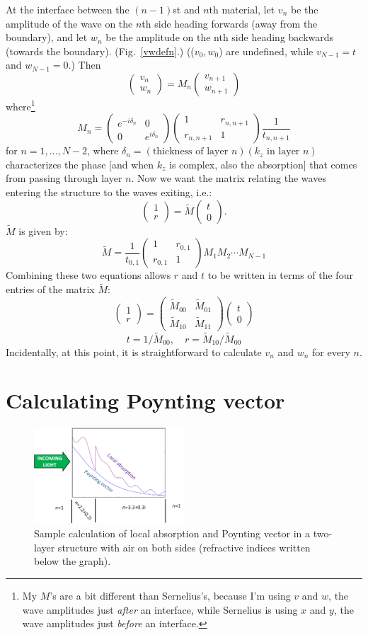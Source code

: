 \documentclass[12pt]{article}
\newcommand{\smat}{\left( \begin{matrix}} %
\newcommand{\emat}{\end{matrix} \right)} %
\renewcommand{\(}{\left(}
\renewcommand{\)}{\right)}
\renewcommand{\r}{\mathbf{r}}
\begin{document}
At the interface between the $(n-1)$st and $n$th material, let $v_n$ be the amplitude of the wave on the $n$th side heading forwards (away from the boundary), and let $w_n$ be the amplitude on the nth side heading backwards (towards the boundary). (Fig.~\ref{vwdefn}.) (($v_0,w_0$) are undefined, while $v_{N-1}=t$ and $w_{N-1}=0$.) Then
$$\smat v_n \\ w_n \emat = M_n \smat v_{n+1}\\w_{n+1}\emat$$
where\footnote{My $M$'s are a bit different than Sernelius's, because I'm using $v$ and $w$, the wave amplitudes just \emph{after} an interface, while Sernelius is using $x$ and $y$, the wave amplitudes just \emph{before} an interface.}
$$M_n = \smat e^{- i \delta_n} & 0 \\ 0 & e^{i \delta_n} \emat \smat 1 & r_{n,n+1} \\ r_{n,n+1} & 1 \emat \frac{1}{t_{n,n+1}}$$
for $n=1,\ldots,N-2$, where $\delta_n = (\text{thickness of layer }n)(k_z\text{ in layer }n)$ characterizes the phase [and when $k_z$ is complex, also the absorption] that comes from passing through layer $n$. Now we want the matrix relating the waves entering the structure to the waves exiting, i.e.:
$$\smat 1 \\ r \emat = \tilde{M} \smat t \\ 0 \emat.$$
$\tilde{M}$ is given by:
$$\tilde{M} = \frac{1}{t_{0,1}} \smat 1 & r_{0,1} \\ r_{0,1} & 1 \emat M_1 M_2 \cdots M_{N-1}$$
Combining these two equations allows $r$ and $t$ to be written in terms of the four entries of the matrix $\tilde{M}$:
$$\smat 1\\r \emat = \smat \tilde{M}_{00} & \tilde{M}_{01} \\ \tilde{M}_{10} & \tilde{M}_{11} \emat \smat t \\ 0 \emat$$
$$t = 1/\tilde{M}_{00}, \quad r = \tilde{M}_{10}/\tilde{M}_{00}$$
Incidentally, at this point, it is straightforward to calculate $v_n$ and $w_n$ for every $n$.

\section{Calculating Poynting vector}

\begin{figure}[htb]
\centering
\includegraphics[width=0.5\textwidth]{spatiallyresolvedexample.png}
\caption{Sample calculation of local absorption and Poynting vector in a two-layer structure with air on both sides (refractive indices written below the graph).\label{spatiallyresolvedexample}}
\end{figure}
\end{document}
